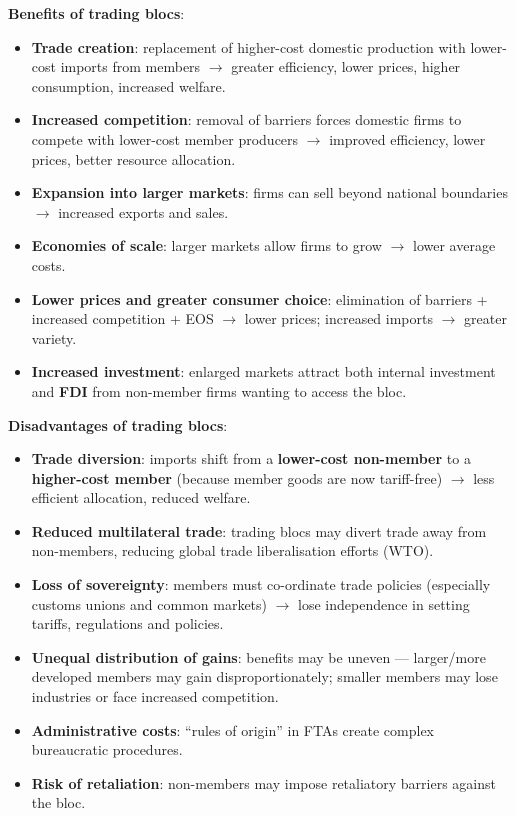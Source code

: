 \textbf{Benefits of trading blocs}:
\begin{itemize}
  \item \textbf{Trade creation}: replacement of higher-cost domestic production with lower-cost imports from members $\to$ greater efficiency, lower prices, higher consumption, increased welfare.
  \item \textbf{Increased competition}: removal of barriers forces domestic firms to compete with lower-cost member producers $\to$ improved efficiency, lower prices, better resource allocation.
  \item \textbf{Expansion into larger markets}: firms can sell beyond national boundaries $\to$ increased exports and sales.
  \item \textbf{Economies of scale}: larger markets allow firms to grow $\to$ lower average costs.
  \item \textbf{Lower prices and greater consumer choice}: elimination of barriers + increased competition + EOS $\to$ lower prices; increased imports $\to$ greater variety.
  \item \textbf{Increased investment}: enlarged markets attract both internal investment and \textbf{FDI} from non-member firms wanting to access the bloc.
\end{itemize}
\textbf{Disadvantages of trading blocs}:
\begin{itemize}
  \item \textbf{Trade diversion}: imports shift from a \textbf{lower-cost non-member} to a \textbf{higher-cost member} (because member goods are now tariff-free) $\to$ less efficient allocation, reduced welfare.
  \item \textbf{Reduced multilateral trade}: trading blocs may divert trade away from non-members, reducing global trade liberalisation efforts (WTO).
  \item \textbf{Loss of sovereignty}: members must co-ordinate trade policies (especially customs unions and common markets) $\to$ lose independence in setting tariffs, regulations and policies.
  \item \textbf{Unequal distribution of gains}: benefits may be uneven --- larger/more developed members may gain disproportionately; smaller members may lose industries or face increased competition.
  \item \textbf{Administrative costs}: ``rules of origin'' in FTAs create complex bureaucratic procedures.
  \item \textbf{Risk of retaliation}: non-members may impose retaliatory barriers against the bloc.
\end{itemize}
